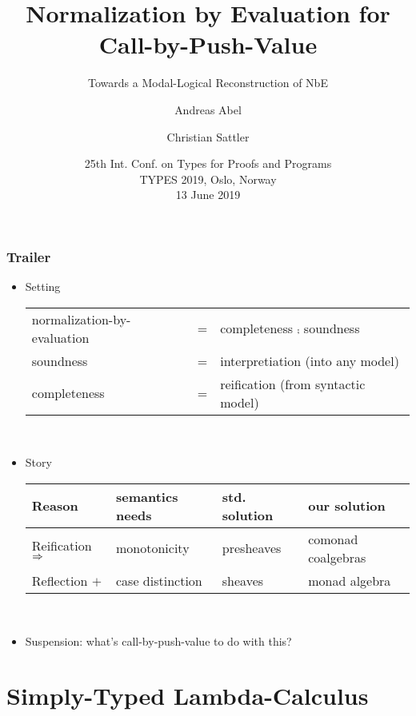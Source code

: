 \documentclass[t,fleqn,usenames,dvipsnames]{beamer}
\title[NbE for CBPV]{Normalization by Evaluation for Call-by-Push-Value}
\subtitle{Towards a Modal-Logical Reconstruction of NbE}
\author[Abel]{
  Andreas Abel\inst{1}
  \and Christian Sattler\inst{2}
}
\institute[] %
{
  \inst{1}%
  Department of Computer Science and Engineering\\
  Chalmers and Gothenburg University, Sweden \\[1ex]
  \and
  \inst{2}%
  School of Computer Science\\
  University of Nottingham, UK \\[1ex]
}
\date[TYPES 2019] %
{ 25th Int. Conf. on Types for Proofs and Programs \\
  TYPES 2019, Oslo, Norway \\
  13 June 2019
}
\begin{document}
\maketitle



\begin{frame}%
\frametitle{Trailer}
\begin{itemize}
\item Setting \\[2ex]
    \begin{tabular}{@{}lcl@{}}
normalization-by-evaluation & = & completeness $\comp$ soundness \\
soundness & = & interpretiation (into any model) \\
completeness & = & reification (from syntactic model) \\
    \end{tabular}
\\[1ex]

\item Story \\[2ex]
  \begin{tabular}{@{}llll@{}}
Reason & semantics needs & std. solution & our solution \\
\hline
Reification $\Rightarrow$ & monotonicity & presheaves & comonad coalgebras \\
Reflection  $+$   & case distinction & sheaves & monad algebra \\
  \end{tabular}
\\[1ex]

\item Suspension: what's call-by-push-value to do with this?
\end{itemize}
\end{frame}


\section{Simply-Typed Lambda-Calculus}

\end{document}
